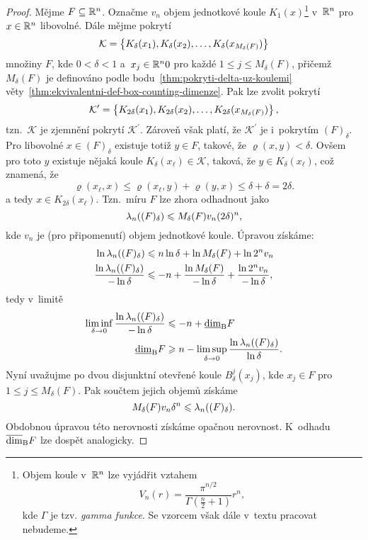 \begin{proof}
    Mějme $F\subseteq\mathbb{R}^n$. Označme $v_n$ objem jednotkové koule $K_1(x)$\footnote{Objem koule v~$\mathbb{R}^n$ lze vyjádřit vztahem
    \[V_n(r)=\dfrac{\pi^{n/2}}{\Gamma\left(\frac{n}{2}+1\right)}r^n,\]
    kde $\Gamma$ je tzv. \emph{gamma funkce}. Se vzorcem však dále v~textu pracovat nebudeme.
    } v~$\mathbb{R}^n$ pro $x\in\mathbb{R}^n$ libovolné. Dále mějme pokrytí
    \[\mathcal{K}=\left\{K_\delta(x_1),K_\delta(x_2),\ldots,K_\delta(x_{M_\delta(F)})\right\}\]
    množiny $F$, kde $0<\delta<1$ a~$x_j\in\mathbb{R}^n0$ pro každé $1\leqslant j\leqslant M_\delta(F)$, přičemž $M_\delta(F)$ je definováno podle bodu~\ref{thm:pokryti-delta-uz-koulemi} věty~\ref{thm:ekvivalentni-def-box-counting-dimenze}. Pak lze zvolit pokrytí
    \[\mathcal{K}^\prime=\left\{K_{2\delta}(x_1),K_{2\delta}(x_2),\ldots,K_{2\delta}(x_{M_\delta(F)})\right\},\]
    tzn.~$\mathcal{K}$ je zjemnění pokrytí $\mathcal{K}^\prime$. Zároveň však platí, že $\mathcal{K}^\prime$ je i~pokrytím $(F)_\delta$. Pro libovolné $x\in (F)_\delta$ existuje totiž $y\in F$, takové, že $\varrho(x,y)<\delta$. Ovšem pro toto $y$ existuje nějaká koule $K_\delta(x_\ell)\in\mathcal{K}$, taková, že $y\in K_\delta(x_\ell)$, což znamená, že
    \[\varrho(x_\ell,x)\leqslant\varrho(x_\ell,y)+\varrho(y,x)\leqslant\delta+\delta=2\delta.\]
    a tedy $x\in K_{2\delta}(x_\ell)$. Tzn.~míru $F$ lze zhora odhadnout jako
    \[\lambda_n((F)_\delta)\leqslant M_\delta(F)v_n(2\delta)^n,\]
    kde $v_n$ je (pro připomenutí) objem jednotkové koule. Úpravou získáme:
    \begin{align*}
        \ln{\ensuremath{\lambda_n}((F)_\delta)}&\leqslant n\ln{\delta}+\ln{M_\delta(F)}+\ln{2^nv_n}\\
        \dfrac{\ln{\ensuremath{\lambda_n}((F)_\delta)}}{-\ln\delta}&\leqslant -n+\dfrac{\ln{M_\delta(F)}}{-\ln\delta}+\dfrac{\ln{2^nv_n}}{-\ln\delta},
    \end{align*}
    tedy v~limitě
    \begin{align*}
        \liminf_{\delta\to 0}\dfrac{\ln\lambda_n((F)_\delta)}{-\ln\delta}&\leqslant -n+\underline{\dim}_\textup{B}{F}\\
        \underline{\dim}_\textup{B}{F}&\geqslant n-\limsup_{\delta\to 0}\dfrac{\ln\lambda_n((F)_\delta)}{\ln\delta}.
    \end{align*}
    Nyní uvažujme po dvou disjunktní otevřené koule $B_\delta^j(x_j)$, kde $x_j\in F$ pro $1\leqslant j\leqslant M_\delta(F)$. Pak součtem jejich objemů získáme
    \[M_\delta(F)v_n\delta^n\leqslant\lambda_n((F)_\delta).\]
    Obdobnou úpravou této nerovnosti získáme opačnou nerovnost. K~odhadu $\overline{\dim}_\textup{B}{F}$ lze dospět analogicky.
\end{proof}
